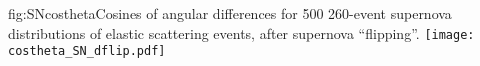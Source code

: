 

\begin{dunefigure}{fig:SNcostheta}{Cosines of angular differences for 500
    260-event supernova distributions of elastic scattering events,
    after supernova ``flipping''.}
  \texttt{[image: costheta\_SN\_dflip.pdf]}
\end{dunefigure}






